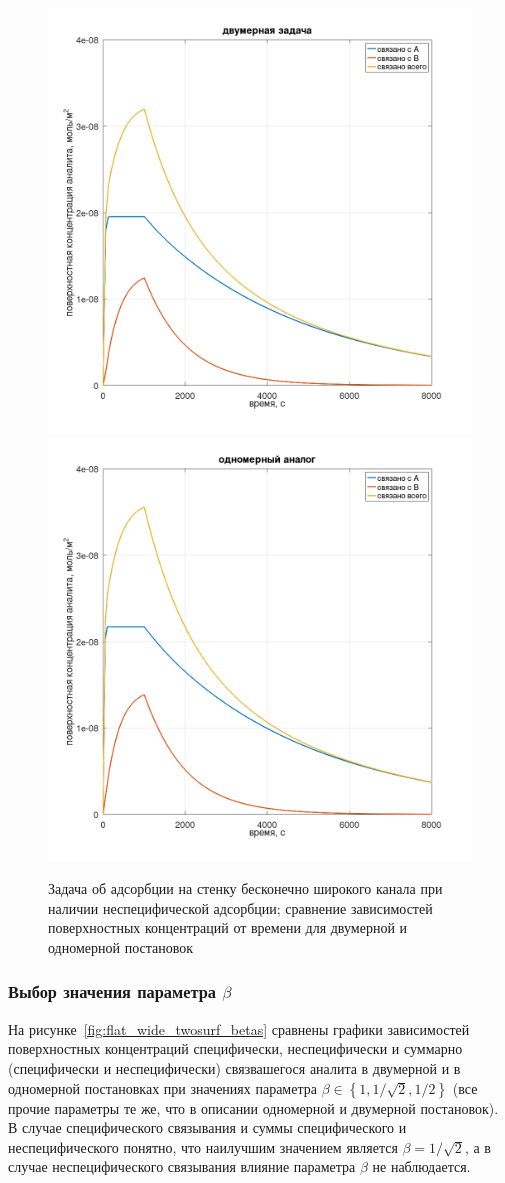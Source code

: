 \documentclass[oneside,final,12pt]{extreport}
\begin{document}
\begin{figure}
  \centering
  \includegraphics[width=.5\textwidth]{pic/flat_wide_twosurf_plane_abs}%
  \includegraphics[width=.5\textwidth]{pic/flat_wide_twosurf_onedim_abs}

  \caption{%
    \label{fig:flat_wide_two_surf_oneplate}%
    Задача об адсорбции на стенку бесконечно широкого канала
    при наличии неспецифической адсорбции;
    сравнение зависимостей поверхностных концентраций от времени
    для двумерной и одномерной постановок
  }

\end{figure}

\subsubsection*{Выбор значения параметра $\beta$}

На рисунке~\ref{fig:flat_wide_twosurf_betas} сравнены
графики зависимостей поверхностных концентраций специфически, неспецифически и
суммарно (специфически и неспецифически) связвашегося аналита
в двумерной и в одномерной постановках при значениях параметра
$\beta \in \left\{1,1/\sqrt{2},1/2\right\}$
(все прочие параметры те же, что в описании одномерной и двумерной постановок).
В случае специфического связывания и суммы специфического и неспецифического
понятно, что наилучшим значением является $\beta = 1/\sqrt{2}$,
а в случае неспецифического связывания влияние параметра $\beta$ не наблюдается.
\end{document}
